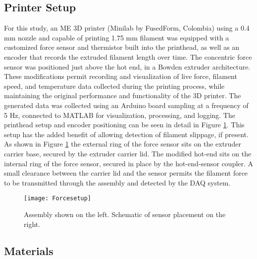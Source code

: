 \documentclass[main.tex]{subfiles}
\begin{document}
\subsection{Printer Setup} \label{ssec:printer}

For this study, an ME 3D printer (Minilab by FusedForm, Colombia) using a 0.4 mm nozzle and capable of printing 1.75 mm filament was equipped with a customized force sensor and thermistor built into the printhead, as well as an encoder that records the extruded filament length over time. The concentric force sensor was positioned just above the hot end, in a Bowden extruder architecture. These modifications permit recording and visualization of live force, filament speed, and temperature data collected during the printing process, while maintaining the original performance and functionality of the 3D printer. The generated data was collected using an Arduino board sampling at a frequency of 5 Hz, connected to MATLAB for visualization, processing, and logging. The printhead setup and encoder positioning can be seen in detail in Figure \ref{fig:printsetup}. This setup has the added benefit of allowing detection of filament slippage, if present. As shown in Figure \ref{fig:printsetup} the external ring of the force sensor sits on the extruder carrier base, secured by the extruder carrier lid. The modified hot-end sits on the internal ring of the force sensor, secured in place by the hot-end-sensor coupler. A small clearance between the carrier lid and the sensor permits the filament force to be transmitted through the assembly and detected by the DAQ system.

\begin{figure}[!htbp]
	\center
	\texttt{[image: Forcesetup]}
	\caption{Assembly shown on the left. Schematic of sensor placement on the right.} \label{fig:printsetup}
\end{figure}

\subsection{Materials} \label{ssec:materials_dataex}
\end{document}
